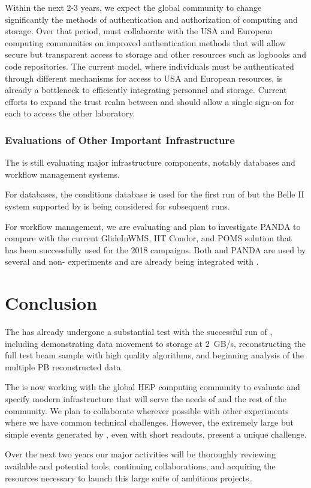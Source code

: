 Within the next 2-3 years, we expect the global  community to change significantly the methods of authentication and authorization of computing and storage. 
Over that period,  must collaborate with the USA and European  computing communities on improved authentication methods  that will allow secure but transparent access to storage and other resources such as logbooks and code repositories.  The current model, where individuals must be authenticated through different mechanisms for access to USA and European resources, is already a bottleneck to efficiently integrating personnel and storage. 
Current efforts to expand the trust realm between  and  should allow a single sign-on for each to access the other laboratory.


\subsubsection{Evaluations of Other Important Infrastructure}

The   is still evaluating major infrastructure components, notably databases and workflow management systems.

For databases\cite{Laycock:2019ynk}, the  conditions database is used for the first run of  but the Belle II\cite{Ritter:2018jxh} system supported by  is being considered for subsequent runs. 

For workflow management, we are evaluating \cite{Falabella:2016waj} and plan to investigate PANDA\cite{Megino:2017ywl} to compare with the current GlideInWMS, HT Condor, and POMS solution that has been successfully used for the 2018  campaigns.
Both  and PANDA are used by several  and non- experiments and are already being integrated with . 


\section{Conclusion}

The   has already undergone a substantial test with the successful run of , including demonstrating data movement to storage at \SI{2}{GB/s}, reconstructing the full test beam sample with high quality algorithms, and beginning analysis of the multiple PB reconstructed data. 

The  is now working with the global HEP computing community to evaluate and specify modern infrastructure that will serve the needs of  and the rest of the community.  We plan to collaborate wherever possible with other experiments where we have common technical challenges. However, the extremely large but simple events generated by  , even with short readouts, present a unique challenge. 

Over the next two years our major activities  will be  thoroughly reviewing available and potential tools, continuing collaborations, and acquiring the resources necessary to launch this large suite of ambitious projects. 

